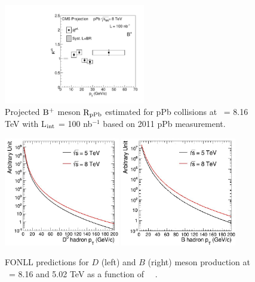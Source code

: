\begin{figure}[h]
\begin{center}
\includegraphics[width= 0.55\textwidth]{figures/canvasrpabplus}
\caption{Projected $\rm B^{+}$ meson $\rm R_{pPb}$ estimated for pPb collisions at \rootsNN\ = 8.16 TeV 
with L$_{\rm int}$ = 100 nb$^{-1}$ based on 2011 pPb measurement.}
\label{fig:Bextrapolated}
\end{center}
\end{figure}

\begin{figure}[h]
\begin{center}
\includegraphics[width= 0.45\textwidth]{figures/D-Sigma.jpg}
\includegraphics[width= 0.45\textwidth]{figures/B-Sigma.jpg}
\caption{FONLL predictions for $D$ (left) and $B$ (right) meson production at \rootsNN\ = 8.16 and 5.02 TeV
 as a function of \pt\ ~\cite{FONLLcharmbottomPP1}.}
\label{fig:plotsDBpredictions}
\end{center}
\end{figure}
